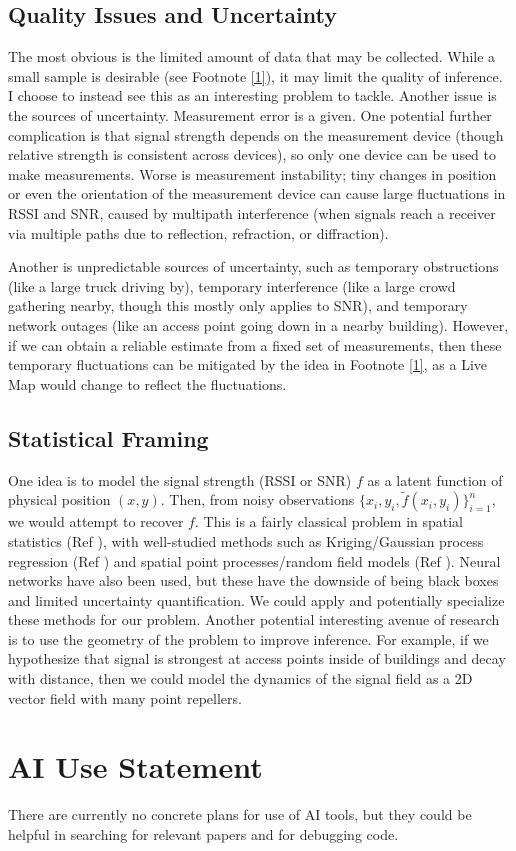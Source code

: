 \documentclass{article}
\begin{document}
\subsection*{Quality Issues and Uncertainty} The most obvious is the limited amount of data that may be collected. While a small sample is desirable (see Footnote \ref{1}), it may limit the quality of inference. I choose to instead see this as an interesting problem to tackle. Another issue is the sources of uncertainty. Measurement error is a given. One potential further complication is that signal strength depends on the measurement device (though relative strength is consistent across devices), so only one device can be used to make measurements. Worse is measurement instability; tiny changes in position or even the orientation of the measurement device can cause large fluctuations in RSSI and SNR, caused by multipath interference (when signals reach a receiver via multiple paths due to reflection, refraction, or diffraction).

Another is unpredictable sources of uncertainty, such as temporary obstructions (like a large truck driving by), temporary interference (like a large crowd gathering nearby, though this mostly only applies to SNR), and temporary network outages (like an access point going down in a nearby building). However, if we can obtain a reliable estimate from a fixed set of measurements, then these temporary fluctuations can be mitigated by the idea in Footnote \ref{1}, as a Live Map would change to reflect the fluctuations.

\subsection*{Statistical Framing} One idea is to model the signal strength (RSSI or SNR) $f$ as a latent function of physical position $(x, y)$. Then, from noisy observations $\{x_i, y_i, \tilde{f}(x_i, y_i)\}_{i=1}^n$, we would attempt to recover $f$. This is a fairly classical problem in spatial statistics (Ref \cite{cressie1993statistics}), with well-studied methods such as Kriging/Gaussian process regression (Ref \cite{rasmussen2006gaussian}) and spatial point processes/random field models (Ref \cite{moller2003statistical}). Neural networks have also been used, but these have the downside of being black boxes and limited uncertainty quantification. We could apply and potentially specialize these methods for our problem. Another potential interesting avenue of research is to use the geometry of the problem to improve inference. For example, if we hypothesize that signal is strongest at access points inside of buildings and decay with distance, then we could model the dynamics of the signal field as a 2D vector field with many point repellers.

\newpage




\section*{AI Use Statement}

There are currently no concrete plans for use of AI tools, but they could be helpful in searching for relevant papers and for debugging code.
\end{document}
